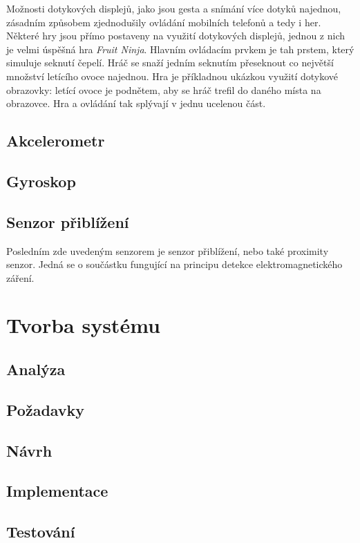 \documentclass[thesis=B,czech,hidelinks]{FITthesis}[2012/06/26] %
\begin{document}
Možnosti dotykových displejů, jako jsou gesta a snímání více dotyků najednou, zásadním způsobem zjednodušily ovládání mobilních telefonů a tedy i her. Některé hry jsou přímo postaveny na využití dotykových displejů, jednou z nich je velmi úspěšná hra \textit{Fruit Ninja}\cite{fruitninja}. Hlavním ovládacím prvkem je tah prstem, který simuluje seknutí čepelí. Hráč se snaží jedním seknutím přeseknout co největší množství letícího ovoce najednou. Hra je příkladnou ukázkou využití dotykové obrazovky: letící ovoce je podnětem, aby se hráč trefil do daného místa na obrazovce. Hra a ovládání tak splývají v jednu ucelenou část.

\section{Akcelerometr}
\label{section:accelerometer}


\section{Gyroskop}

\section{Senzor přiblížení}

Posledním zde uvedeným senzorem je senzor přiblížení, nebo také proximity senzor. Jedná se o součástku fungující na principu detekce elektromagnetického záření. \cite{proximity}

\chapter{Tvorba systému}
\label{chapter:implementation}

\section{Analýza}
\section{Požadavky}
\section{Návrh}
\section{Implementace}
\section{Testování}
\end{document}
